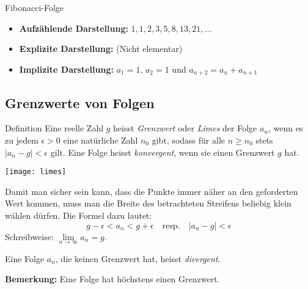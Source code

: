 \begin{definition}{Fibonacci-Folge}
    \begin{itemize}
        \item \textbf{Aufzählende Darstellung:} $1, 1, 2, 3, 5, 8, 13, 21, \dots$
        \item \textbf{Explizite Darstellung:} (Nicht elementar)
        \item \textbf{Implizite Darstellung:} $a_1 = 1$, $a_2 = 1$ und $a_{n+2} = a_n + a_{n+1}$
    \end{itemize}
\end{definition}

\subsection{Grenzwerte von Folgen}\label{subsec:grenzwerte-von-folgen}

\begin{definition}{Definition}
    Eine reelle Zahl $g$ heisst \emph{Grenzwert} oder \emph{Limes} der Folge $a_n$, wenn es zu jedem $\epsilon > 0$ eine natürliche Zahl $n_0$ gibt, sodass für alle $n \geq n_0$ stets $|a_n - g| < \epsilon$ gilt.
    Eine Folge heisst \emph{konvergent}, wenn sie einen Grenzwert $g$ hat.
\end{definition}

\begin{center}
    \texttt{[image: limes]}
\end{center}

Damit man sicher sein kann, dass die Punkte immer näher an den geforderten Wert kommen, muss man die Breite des betrachteten Streifens beliebig klein wählen dürfen.
Die Formel dazu lautet: \[g - \epsilon < a_n < g + \epsilon \quad \text{resp.} \quad |a_n - g| < \epsilon\]
Schreibweise: $\lim \limits_{n \rightarrow \infty} a_n = g$.

Eine Folge $a_n$, die keinen Grenzwert hat, heisst \emph{divergent}.

\textbf{Bemerkung:} Eine Folge hat höchstens einen Grenzwert.

